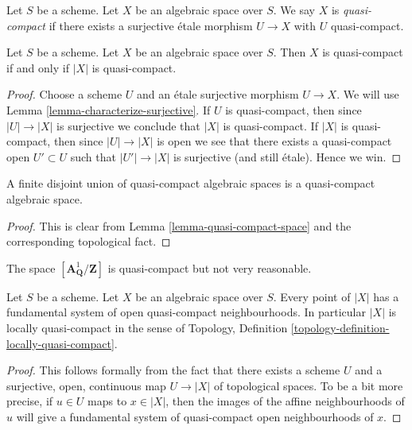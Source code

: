 \begin{definition}
\label{definition-quasi-compact}
Let $S$ be a scheme.
Let $X$ be an algebraic space over $S$.
We say $X$ is {\it quasi-compact} if there exists a surjective
\'etale morphism $U \to X$ with $U$ quasi-compact.
\end{definition}

\begin{lemma}
\label{lemma-quasi-compact-space}
Let $S$ be a scheme.
Let $X$ be an algebraic space over $S$.
Then $X$ is quasi-compact if and only if $|X|$ is quasi-compact.
\end{lemma}

\begin{proof}
Choose a scheme $U$ and an \'etale surjective morphism $U \to X$.
We will use Lemma \ref{lemma-characterize-surjective}.
If $U$ is quasi-compact, then since $|U| \to |X|$ is surjective
we conclude that $|X|$ is quasi-compact.
If $|X|$ is quasi-compact, then since $|U| \to |X|$ is open
we see that there exists a quasi-compact open $U' \subset U$
such that $|U'| \to |X|$ is surjective (and still \'etale).
Hence we win.
\end{proof}

\begin{lemma}
\label{lemma-finite-disjoint-quasi-compact}
A finite disjoint union of quasi-compact algebraic spaces is
a quasi-compact algebraic space.
\end{lemma}

\begin{proof}
This is clear from
Lemma \ref{lemma-quasi-compact-space}
and the corresponding topological fact.
\end{proof}

\begin{example}
\label{example-quasi-compact-not-very-reasonable}
The space $[\mathbf{A}^1_{\mathbf{Q}}/\mathbf{Z}]$ is
quasi-compact but not very reasonable.
\end{example}

\begin{lemma}
\label{lemma-space-locally-quasi-compact}
Let $S$ be a scheme.
Let $X$ be an algebraic space over $S$.
Every point of $|X|$ has a fundamental system of open
quasi-compact neighbourhoods.
In particular $|X|$ is locally quasi-compact in the sense of
Topology, Definition \ref{topology-definition-locally-quasi-compact}.
\end{lemma}

\begin{proof}
This follows formally from the fact that there exists a scheme
$U$ and a surjective, open, continuous map
$U \to |X|$ of topological spaces. To be a bit more precise, if
$u \in U$ maps to $x \in |X|$, then the images of the affine
neighbourhoods of $u$ will give a fundamental system of quasi-compact
open neighbourhoods of $x$.
\end{proof}






